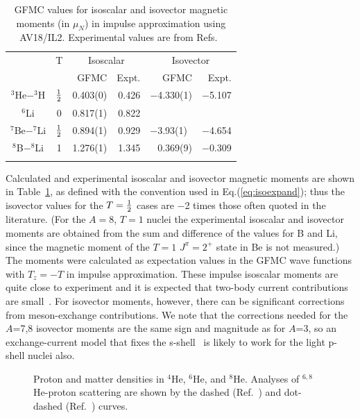 \begin{table}
\caption{GFMC values for isoscalar and isovector magnetic moments
(in $\mu_N$) in impulse approximation using AV18/IL2.
Experimental values are from Refs.~\protect\cite{TUNL3,TUNL4,AS88,moments-A8}}
\label{tab:mag-mom}
\begin{tabular}{ccrrrr}
\toprule
            &    T      &\multicolumn{2}{c}{Isoscalar} & \multicolumn{2}{c}{Isovector} \\
            &                 &    GFMC &     Expt.   & GFMC     & Expt.  \\
\colrule                                              
$^3$He$-^3$H  & $\textstyle{1\over2}$ &  0.403(0) &   0.426    & $-$4.330(1) & $-$5.107 \\
$^6$Li        &    0          &  0.817(1) &   0.822                             \\
$^7$Be$-^7$Li & $\textstyle{1\over2}$ &  0.894(1) &   0.929    & $-$3.93(1)~ & $-$4.654 \\
$^8$B$-^8$Li  &    1          &  1.276(1) &   1.345    &   0.369(9) & $-$0.309 \\
\botrule
\end{tabular}
\end{table}

Calculated and experimental isoscalar and isovector magnetic moments are 
shown in Table~\ref{tab:mag-mom}, as defined with the convention used in 
Eq.(\ref{eq:isoexpand}); thus the isovector values for the $T=\textstyle{1\over2}$ 
cases are $-$2 times those often quoted in the literature.
(For the $A=8$, $T=1$ nuclei the experimental isoscalar and isovector moments 
are obtained from the sum and difference of the values for B and Li, since the 
magnetic moment of the $T=1$ $J^{\pi}=2^+$ state in Be is not measured.)
The moments were calculated as expectation values in the GFMC wave functions 
with $T_z=-T$ in impulse approximation.
These impulse isoscalar moments are quite close to experiment and it is
expected that two-body current contributions are small~\cite{SPR89}.
For isovector moments, however, there can be significant corrections from
meson-exchange contributions.
We note that the corrections needed for the $A$=7,8 isovector moments are 
the same sign and magnitude as for $A$=3, so an exchange-current model that 
fixes the s-shell~\cite{MRS98} is likely to work for the light p-shell 
nuclei also.

\begin{figure}
\centerline{}
\caption{Proton and matter densities in $^4$He, $^6$He, and $^8$He.
Analyses of $^{6,8}$He-proton scattering are shown by the
dashed (Ref.~\protect\cite{Alkhazov}) 
and dot-dashed (Ref.~\protect\cite{Al-Khalili}) curves.}
\label{fig:he-rho1}
\end{figure}

